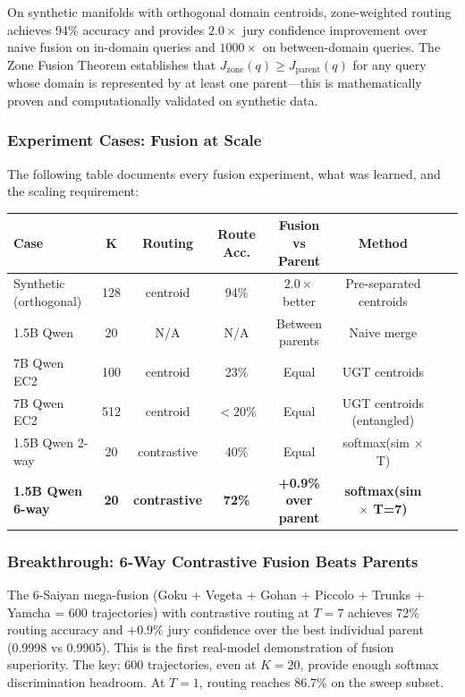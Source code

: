 \documentclass[11pt]{article}
\begin{document}
On synthetic manifolds with orthogonal domain centroids, zone-weighted routing achieves 94\% accuracy and provides $2.0\times$ jury confidence improvement over naive fusion on in-domain queries and $1000\times$ on between-domain queries. The Zone Fusion Theorem establishes that $J_{\text{zone}}(q) \ge J_{\text{parent}}(q)$ for any query whose domain is represented by at least one parent---this is mathematically proven and computationally validated on synthetic data.

\subsubsection*{Experiment Cases: Fusion at Scale}

The following table documents every fusion experiment, what was learned, and the scaling requirement:

\begin{center}
\begin{tabular}{lccccccl}
\toprule
\textbf{Case} & \textbf{K} & \textbf{Routing} & \textbf{Route Acc.} & \textbf{Fusion vs Parent} & \textbf{Method} \\
\midrule
Synthetic (orthogonal) & 128 & centroid & 94\% & $2.0\times$ better & Pre-separated centroids \\
1.5B Qwen & 20 & N/A & N/A & Between parents & Naive merge \\
7B Qwen EC2 & 100 & centroid & 23\% & Equal & UGT centroids \\
7B Qwen EC2 & 512 & centroid & $<20\%$ & Equal & UGT centroids (entangled) \\
1.5B Qwen 2-way & 20 & contrastive & 40\% & Equal & softmax(sim $\times$ T) \\
\textbf{1.5B Qwen 6-way} & \textbf{20} & \textbf{contrastive} & \textbf{72\%} & \textbf{+0.9\% over parent} & \textbf{softmax(sim $\times$ T=7)} \\
\bottomrule
\end{tabular}
\end{center}

\subsubsection*{Breakthrough: 6-Way Contrastive Fusion Beats Parents}

The 6-Saiyan mega-fusion (Goku + Vegeta + Gohan + Piccolo + Trunks + Yamcha = 600 trajectories) with contrastive routing at $T=7$ achieves 72\% routing accuracy and $+0.9\%$ jury confidence over the best individual parent (0.9998 vs 0.9905). This is the first real-model demonstration of fusion superiority. The key: 600 trajectories, even at $K=20$, provide enough softmax discrimination headroom. At $T=1$, routing reaches 86.7\% on the sweep subset.
\end{document}

